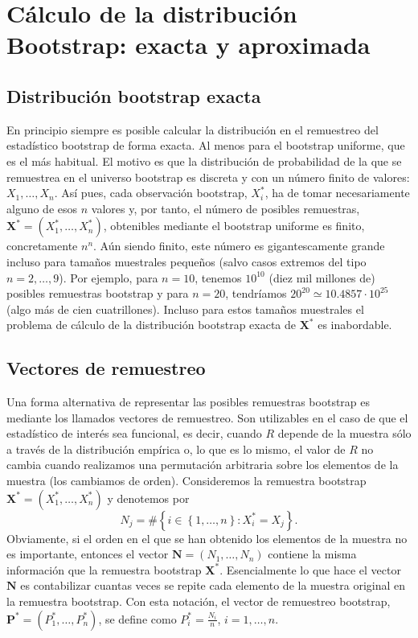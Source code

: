 \documentclass[]{book}
\theoremstyle{break}
\theoremstyle{definition}
\theoremstyle{definition}
\theoremstyle{definition}
\theoremstyle{remark}
\begin{document}
\section{Cálculo de la distribución Bootstrap: exacta y
aproximada}\label{cuxe1lculo-de-la-distribuciuxf3n-bootstrap-exacta-y-aproximada}

\subsection{Distribución bootstrap
exacta}\label{distribuciuxf3n-bootstrap-exacta}

En principio siempre es posible calcular la distribución en el
remuestreo del estadístico bootstrap de forma exacta. Al menos para el
bootstrap uniforme, que es el más habitual. El motivo es que la
distribución de probabilidad de la que se remuestrea en el universo
bootstrap es discreta y con un número finito de valores:
\(X_1,\ldots ,X_n\). Así pues, cada observación bootstrap,
\(X_i^{\ast}\), ha de tomar necesariamente alguno de esos \(n\) valores
y, por tanto, el número de posibles remuestras,
\(\mathbf{X}^{\ast}=\left( X_1^{\ast },\ldots ,X_n^{\ast} \right)\),
obtenibles mediante el bootstrap uniforme es finito, concretamente
\(n^{n}\). Aún siendo finito, este número es gigantescamente grande
incluso para tamaños muestrales pequeños (salvo casos extremos del tipo
\(n=2,\ldots ,9\)). Por ejemplo, para \(n=10\), tenemos \(10^{10}\)
(diez mil millones de) posibles remuestras bootstrap y para \(n=20\),
tendríamos \(20^{20}\simeq 10.4857\cdot 10^{25}\) (algo más de cien
cuatrillones). Incluso para estos tamaños muestrales el problema de
cálculo de la distribución bootstrap exacta de \(\mathbf{X}^{\ast}\) es
inabordable.

\subsection{Vectores de remuestreo}\label{vectores-de-remuestreo}

Una forma alternativa de representar las posibles remuestras bootstrap
es mediante los llamados vectores de remuestreo. Son utilizables en el
caso de que el estadístico de interés sea funcional, es decir, cuando
\(R\) depende de la muestra sólo a través de la distribución empírica o,
lo que es lo mismo, el valor de \(R\) no cambia cuando realizamos una
permutación arbitraria sobre los elementos de la muestra (los cambiamos
de orden). Consideremos la remuestra bootstrap
\(\mathbf{X}^{\ast} =\left( X_1^{\ast},\ldots ,X_n^{\ast} \right)\) y
denotemos por \[N_j=\#\left\{ i\in \left\{ 1,\ldots ,n\right\} : 
X_i^{\ast}=X_j\right\}.\] Obviamente, si el orden en el que se han
obtenido los elementos de la muestra no es importante, entonces el
vector \(\mathbf{N}=\left( N_1,\ldots ,N_n \right)\) contiene la misma
información que la remuestra bootstrap \(\mathbf{X}^{\ast}\).
Esencialmente lo que hace el vector \(\mathbf{N}\) es contabilizar
cuantas veces se repite cada elemento de la muestra original en la
remuestra bootstrap. Con esta notación, el vector de remuestreo
bootstrap,
\(\mathbf{P}^{\ast}=\left( P_1^{\ast},\ldots ,P_n^{\ast} \right)\), se
define como \(P_i^{\ast}=\frac{N_i}{n}\), \(i=1,\ldots ,n\).
\end{document}
